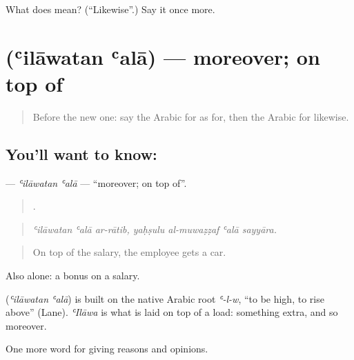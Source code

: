 \begin{tcolorbox}[breakable,colback=teal!4,colframe=teal!35!black,title={Before you move on}]
What does  mean? (\textquotedblleft{}Likewise\textquotedblright{}.) Say it once more.
\end{tcolorbox}
\section[\texorpdfstring{\ar{علاوة} \ar{على} (ʿilāwatan ʿalā)}{علاوة على (ʿilāwatan ʿalā)}]{  (ʿilāwatan ʿalā) — moreover; on top of}

\label{lesson:AR-C375-ilawatan-ala}



\begin{quote}
Before the new one: say the Arabic for as for, then the Arabic for likewise.
\end{quote}

\subsection*{You'll want to know:  }
\textbf{ } — \emph{ʿilāwatan ʿalā} — \textquotedblleft{}moreover; on top of\textquotedblright{}.

\begin{quote}
      .
\end{quote}

\begin{quote}
\emph{ʿilāwatan ʿalā ar-rātib, yaḥṣulu al-muwaẓẓaf ʿalā sayyāra.}
\end{quote}

\begin{quote}
On top of the salary, the employee gets a car.
\end{quote}

Also  alone: a bonus on a salary.

\begin{cousinweb}
\textbf{ } (\emph{ʿilāwatan ʿalā}) is built on the native Arabic root \emph{ʿ-l-w}, \textquotedblleft{}to be high, to rise above\textquotedblright{} (Lane). \emph{ʿIlāwa} is what is laid on top of a load: something extra, and so moreover.
\end{cousinweb}

\begin{grammarlens}[title={What you've built}]
One more word for giving reasons and opinions.
\end{grammarlens}

